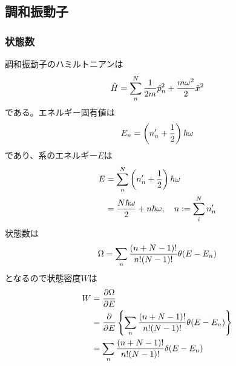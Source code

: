 \documentclass[dvipdfmx, 11pt, a4paper]{jsarticle}
\theoremstyle{definition}
\begin{document}
\subsection{調和振動子}
\subsubsection{状態数}
    調和振動子のハミルトニアンは
    \begin{align}
        \hat{H} = \sum_n^N \frac{1}{2m} \hat{p}_n^2 + \frac{m\omega^2}{2} \hat{x}^2 \notag
    \end{align}
    である。エネルギー固有値は
    \begin{align}
        E_n = \left( n_n' + \frac{1}{2} \right)\hbar \omega \notag
    \end{align}
    であり、系のエネルギー$E$は
    \begin{align}
        E &= \sum_n^N \left( n_n' + \frac{1}{2} \right)\hbar \omega \notag \\
        &= \frac{N \hbar \omega }{2} + n\hbar \omega ,\quad n:= \sum_i^N n_n'
    \end{align}
    状態数は
    \begin{align}
        \Omega = \sum_n \frac{(n+N-1)!}{n!(N-1)!} \theta(E-E_n) \notag 
    \end{align}
    となるので状態密度$W$は
    \begin{align}
        W &= \frac{\partial \Omega}{\partial E} \notag \\
        &= \frac{\partial }{\partial E} \left\{ \sum_n \frac{(n+N-1)!}{n!(N-1)!} \theta(E-E_n)  \right\} \notag \\
        &= \sum_n \frac{(n+N-1)!}{n!(N-1)!} \delta(E-E_n) \notag
    \end{align}
\end{document}

